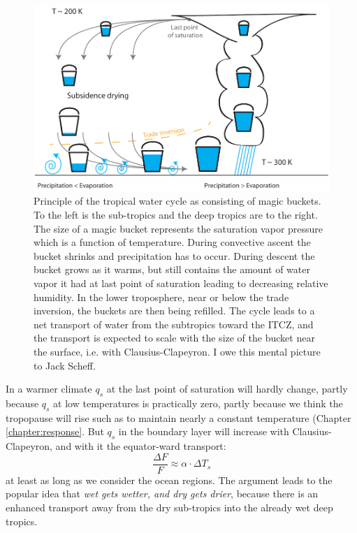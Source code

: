 \documentclass[12pt]{book}
\begin{document}
\begin{figure}
\begin{center}
\includegraphics[width=13 cm]{../Illustrations/Water_cycle_buckets.pdf}
\end{center}
\caption{ Principle of the tropical water cycle as consisting of magic buckets. To the left is the sub-tropics and the deep tropics are to the right. The size of a magic bucket represents the saturation vapor pressure which is a function of temperature. During convective ascent the bucket shrinks and precipitation has to occur. During descent the bucket grows as it warms, but still contains the amount of water vapor it had at last point of saturation leading to decreasing relative humidity. In the lower troposphere, near or below the trade inversion, the buckets are then being refilled. The cycle leads to a net transport of water from the subtropics toward the ITCZ, and the transport is expected to scale with the size of the bucket near the surface, i.e. with Clausius-Clapeyron. I owe this mental picture to Jack Scheff. } 
\label{fig:water_cycle_buckets}
\end{figure}

In a warmer climate $q_s$ at the last point of saturation will hardly change, partly because $q_s$ at low temperatures is practically zero, partly because we think the tropopause will rise such as to maintain nearly a constant temperature (Chapter \ref{chapter:response}. But $q_s$ in the boundary layer will increase with Clausius-Clapeyron, and with it the equator-ward transport:
$$ \frac{\Delta F}{F} \approx \alpha \cdot \Delta T_s  $$
at least as long as we consider the ocean regions. The argument leads to the popular idea that {\em wet gets wetter, and dry gets drier}, because there is an enhanced transport away from the dry sub-tropics into the already wet deep tropics.
\end{document}
